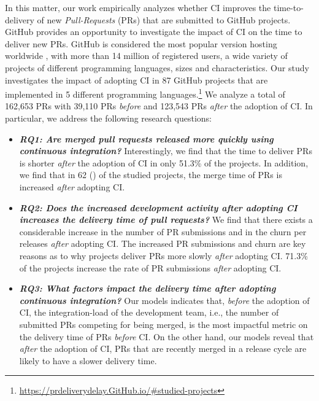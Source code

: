 	
	
	In this matter, our work empirically analyzes whether CI improves the
	time-to-delivery of new {\em Pull-Requests} (PRs) that are submitted to GitHub
	projects. GitHub provides an opportunity to investigate the impact of CI on the
	time to deliver new PRs. GitHub is considered the most popular version hosting
	worldwide \cite{Gousios2012-ys}, with more than 14 million of registered users,
	a wide variety of projects of different programming languages, sizes and
	characteristics. Our study investigates the impact of adopting CI in 87 GitHub
	projects that are implemented in 5 different programming
	languages.\footnote{\url{https://prdeliverydelay.GitHub.io/\#studied-projects}}
	We analyze a total of 162,653 PRs with 39,110 PRs \textit{before} and 123,543
	PRs \textit{after} the adoption of CI. In particular, we address the following
	research questions:
	
	\begin{itemize}
		\item \textit{\textbf{RQ1: Are merged pull requests released more quickly using
				continuous integration?}} Interestingly, we find that  the time to
		deliver PRs is shorter \textit{after} the adoption of CI in
		only 51.3\% of the projects. In addition, we find that in 62
		() of the studied projects, the merge time of
		PRs is increased \textit{after} adopting CI.
		
		\item \textit{\textbf{RQ2: Does the increased development activity
				\textit{after} adopting CI increases the delivery time of pull
				requests?}} We find that there exists a considerable increase in the
		number of PR submissions and in the churn per releases
		\textit{after} adopting CI. The increased PR submissions and
		churn are key reasons as to why projects deliver PRs more
		slowly \textit{after} adopting CI. 71.3\% of the projects
		increase the rate of PR submissions {\em after} adopting CI. 
		
		\item \textit{\textbf{RQ3: What factors impact the delivery time
				\textit{after} adopting continuous integration?}} Our models indicates
		that, \textit{before} the adoption of CI, the integration-load
		of the development team, i.e., the number of submitted PRs
		competing for being merged, is the most impactful metric on the
		delivery time of PRs \textit{before} CI. On the other hand, our
		models reveal that \textit{after} the adoption of CI, PRs that
		are recently merged in a release cycle are likely to have a
		slower delivery time.
	\end{itemize}

